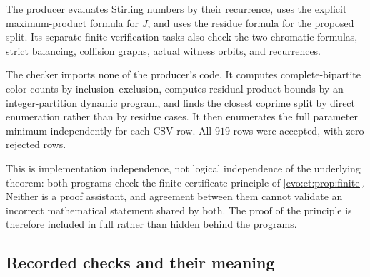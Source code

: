 \documentclass[11pt,a4paper]{article}
\numberwithin{equation}{section}
\theoremstyle{definition}
\theoremstyle{remark}
\begin{document}
The producer  evaluates Stirling numbers by
their recurrence, uses the explicit maximum-product formula for $J$, and uses
the residue formula for the proposed split. Its separate finite-verification
tasks also check the two chromatic formulas, strict balancing, collision
graphs, actual witness orbits, and recurrences.

The checker  imports none of the
producer's code. It computes complete-bipartite color counts by
inclusion--exclusion, computes residual product bounds by an integer-partition
dynamic program, and finds the closest coprime split by direct enumeration
rather than by residue cases. It then enumerates the full parameter minimum
independently for each CSV row. All $919$ rows were accepted, with zero
rejected rows.

This is implementation independence, not logical independence of the
underlying theorem: both programs check the finite certificate principle of
\cref{evo:et:prop:finite}. Neither is a proof assistant, and agreement between
them cannot validate an incorrect mathematical statement shared by both. The
proof of the principle is therefore included in full rather than hidden
behind the programs.

\subsection{Recorded checks and their meaning}
\end{document}
